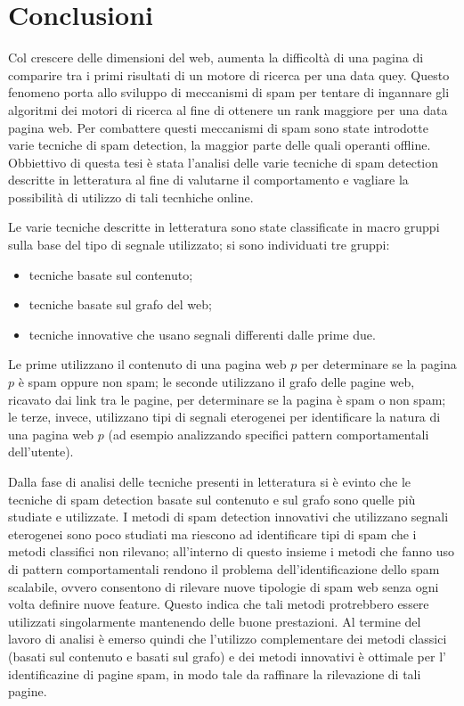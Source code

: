 \chapter{Conclusioni}

Col crescere delle dimensioni del web, aumenta la difficoltà di una pagina di comparire tra i primi risultati di un motore di ricerca per una data quey. Questo fenomeno porta allo sviluppo di meccanismi di spam per tentare di ingannare gli algoritmi dei motori di ricerca al fine di ottenere un rank maggiore per una data pagina web. Per combattere questi meccanismi di spam sono state introdotte varie tecniche di spam detection, la maggior parte delle quali operanti offline.\\
Obbiettivo di questa tesi è stata l'analisi delle  varie tecniche di spam detection descritte in letteratura al fine di valutarne  il comportamento e vagliare la possibilità di utilizzo di tali tecnhiche online. 

Le varie tecniche descritte in letteratura sono state classificate in macro gruppi sulla base del tipo di segnale utilizzato; si sono individuati tre gruppi:
\begin{itemize}
 \item tecniche basate sul contenuto;
 \item tecniche basate sul grafo del web;
 \item tecniche innovative che usano segnali differenti dalle prime due. 
\end{itemize}
Le prime utilizzano il contenuto di una pagina web \(p\) per determinare se la pagina \(p\) è spam oppure non spam; le seconde utilizzano il grafo delle pagine web, ricavato dai link tra le pagine, per determinare se la pagina è spam o non spam; le terze, invece, utilizzano tipi di segnali eterogenei per identificare la natura di una pagina web \(p\) (ad esempio analizzando specifici pattern comportamentali dell'utente).

Dalla fase di analisi delle tecniche presenti in letteratura si è evinto che le tecniche di spam detection basate sul contenuto e sul grafo sono quelle più studiate e utilizzate. I metodi di spam detection innovativi che utilizzano segnali eterogenei sono poco studiati ma riescono ad identificare tipi di spam che i metodi classifici non rilevano; all'interno di questo insieme i metodi che fanno uso di pattern comportamentali rendono il problema dell’identificazione dello spam scalabile, ovvero consentono di rilevare nuove tipologie di spam web senza ogni volta definire nuove feature. Questo indica che tali metodi protrebbero essere utilizzati singolarmente mantenendo delle buone prestazioni. 
Al termine del lavoro di analisi è emerso quindi che l'utilizzo complementare dei metodi classici (basati sul contenuto e basati sul grafo) e dei metodi innovativi è ottimale per l' identificazine di pagine spam, in modo tale da raffinare la rilevazione di tali pagine.

